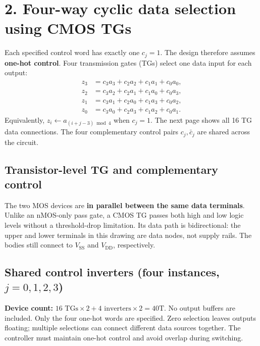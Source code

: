 \documentclass[11pt,a4paper]{article}
\newcommand{\answer}[1]{\par\noindent\colorbox{accent!9}{\parbox{0.96\linewidth}{#1}}\par}
\newcommand{\VDD}{V_{\mathrm{DD}}}
\newcommand{\VSS}{V_{\mathrm{SS}}}
\newcommand{\MOS}[5]{
  \coordinate (#1) at (#2,#3);
  \coordinate (#1t) at ($(#1)+(0,.55)$);
  \coordinate (#1b) at ($(#1)+(0,-.55)$);
  \draw (#1t)--($(#1)+(0,.30)$)--($(#1)+(-.18,.30)$);
  \draw ($(#1)+(-.18,.34)$)--($(#1)+(-.18,-.34)$);
  \draw ($(#1)+(-.18,-.30)$)--($(#1)+(0,-.30)$)--(#1b);
  \draw ($(#1)+(-.35,.33)$)--($(#1)+(-.35,-.33)$);
  \def\type{#5}\def\ptype{p}
  \ifx\type\ptype
    \draw ($(#1)+(-.78,0)$)--($(#1)+(-.53,0)$);
    \draw ($(#1)+(-.465,0)$) circle (.065);
    \draw ($(#1)+(-.40,0)$)--($(#1)+(-.35,0)$);
  \else
    \draw ($(#1)+(-.78,0)$)--($(#1)+(-.35,0)$);
  \fi
  \node[anchor=east] at ($(#1)+(-.82,0)$) {$#4$};
  \node[anchor=west,font=\scriptsize] at ($(#1)+(.10,0)$) {#1};
}
\begin{document}
\newpage
\section*{2. Four-way cyclic data selection using CMOS TGs}
Each specified control word has exactly one $c_j=1$. The design therefore assumes
\textbf{one-hot control}. Four transmission gates (TGs) select one data input for
each output:
\begin{align*}
z_3&=c_3a_3+c_2a_2+c_1a_1+c_0a_0,\\
z_2&=c_3a_2+c_2a_1+c_1a_0+c_0a_3,\\
z_1&=c_3a_1+c_2a_0+c_1a_3+c_0a_2,\\
z_0&=c_3a_0+c_2a_3+c_1a_2+c_0a_1.
\end{align*}
Equivalently, $z_i\leftarrow a_{(i+j-3)\bmod4}$ when $c_j=1$.
The next page shows all 16 TG data connections. The four complementary control
pairs $c_j,\bar c_j$ are shared across the circuit.

\subsection*{Transistor-level TG and complementary control}
\begin{center}
\end{center}
The two MOS devices are \textbf{in parallel between the same data terminals}.
Unlike an nMOS-only pass gate, a CMOS TG passes both high and low logic levels
without a threshold-drop limitation. Its data path is bidirectional: the upper
and lower terminals in this drawing are data nodes, not supply rails. The bodies
still connect to $\VSS$ and $\VDD$, respectively.

\subsection*{Shared control inverters (four instances, $j=0,1,2,3$)}
\begin{center}
\end{center}
\answer{\textbf{Device count:} $16\text{ TGs}\times2+4\text{ inverters}\times2=40\text{T}$.
No output buffers are included. Only the four one-hot words are specified.
Zero selection leaves outputs floating; multiple selections can connect different
data sources together. The controller must maintain one-hot control and avoid
overlap during switching.}
\end{document}
